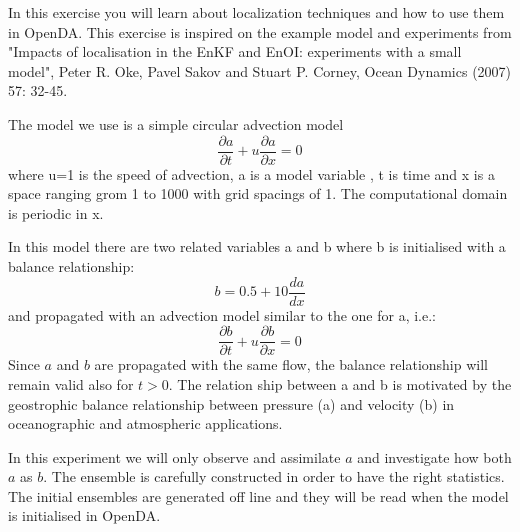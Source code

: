 In this exercise you will learn about localization techniques and how to use them in OpenDA. This exercise is inspired on the example model and experiments from "Impacts of localisation in the EnKF and EnOI: experiments with a small model", Peter R. Oke, Pavel Sakov and Stuart P. Corney, Ocean Dynamics (2007) 57: 32-45.

The model we use is a simple circular advection model 
\begin{equation}
\frac{\partial a}{\partial t}+u\frac{\partial a}{\partial x}=0
\end{equation}
where u=1 is the speed of advection, a is a model variable , t is time and x is a space ranging grom 1 to 1000 with grid spacings of 1. The computational domain is periodic in x.

In this model there are two related variables a and b where b is initialised with a balance relationship:
\begin{equation}\label{eg:b_relation}
b= 0.5 + 10 \frac{da}{dx}
\end{equation}
and propagated with an advection model similar to the one for a, i.e.:
\begin{equation}
\frac{\partial b}{\partial t}+u\frac{\partial b}{\partial x}=0
\end{equation}
Since $a$ and $b$ are propagated with the same flow, the balance relationship will remain valid also for $t>0$.
The relation ship between a and b is motivated by the geostrophic balance relationship between pressure (a) and velocity (b) in oceanographic and atmospheric applications. 

In this experiment we will only observe and assimilate $a$ and investigate how both $a$ as $b$. 
The ensemble is carefully constructed in order to have the right statistics. The initial ensembles are generated off line and they will be read when the model is initialised in OpenDA. 

